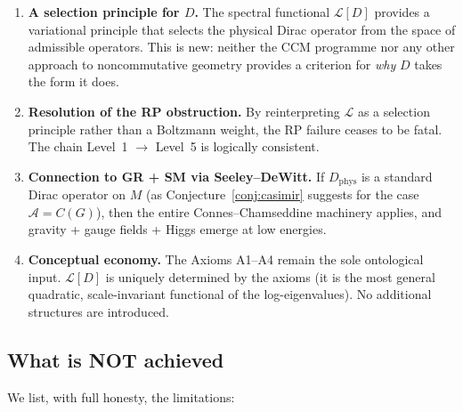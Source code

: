 \documentclass[12pt]{article}
\theoremstyle{definition}
\theoremstyle{remark}
\begin{document}
\begin{enumerate}
\item \textbf{A selection principle for $D$.}
  The spectral functional $\mathcal{L}[D]$ provides a variational
  principle that selects the physical Dirac operator from the space
  of admissible operators.  This is new: neither the CCM programme
  nor any other approach to noncommutative geometry provides a
  criterion for \emph{why} $D$ takes the form it does.

\item \textbf{Resolution of the RP obstruction.}
  By reinterpreting $\mathcal{L}$ as a selection principle rather
  than a Boltzmann weight, the RP failure ceases to be fatal.
  The chain Level~1 $\to$ Level~5 is logically consistent.

\item \textbf{Connection to GR + SM via Seeley--DeWitt.}
  If $D_{\mathrm{phys}}$ is a standard Dirac operator on $M$ (as
  Conjecture~\ref{conj:casimir} suggests for the case
  $\mathcal{A} = C(G)$), then the entire Connes--Chamseddine
  machinery applies, and gravity + gauge fields + Higgs emerge
  at low energies.

\item \textbf{Conceptual economy.}
  The Axioms A1--A4 remain the sole ontological input.
  $\mathcal{L}[D]$ is uniquely determined by the axioms
  (it is the most general quadratic, scale-invariant functional
  of the log-eigenvalues).  No additional structures are introduced.
\end{enumerate}

\subsection{What is NOT achieved}

We list, with full honesty, the limitations:
\end{document}
